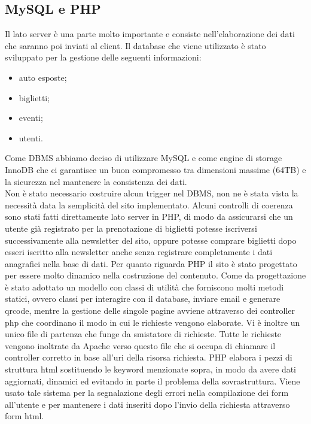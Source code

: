 \subsection{MySQL e PHP}
Il lato server è una parte molto importante e consiste nell'elaborazione dei dati che saranno poi inviati al client. Il database che viene utilizzato è stato sviluppato per la gestione delle seguenti informazioni:
\begin{itemize}
	\item auto esposte;
	\item biglietti;
	\item eventi;
	\item utenti.
\end{itemize}
Come DBMS abbiamo deciso di utilizzare MySQL e come engine di storage InnoDB che ci garantisce un buon compromesso tra dimensioni massime (64TB) e la sicurezza nel mantenere la consistenza dei dati.\\
Non è stato necessario costruire alcun trigger nel DBMS, non ne è stata vista la necessità data la semplicità del sito implementato.
Alcuni controlli di coerenza sono stati fatti direttamente lato server in PHP, di modo da assicurarsi che un utente già registrato per la prenotazione di biglietti potesse iscriversi successivamente alla newsletter del sito, oppure potesse comprare biglietti dopo esseri iscritto alla newsletter anche senza registrare completamente i dati anagrafici nella base di dati.
Per quanto riguarda PHP il sito è stato progettato per essere molto dinamico nella costruzione del contenuto.
Come da progettazione è stato adottato un modello con classi di utilità che forniscono molti metodi statici, ovvero classi per interagire con il database, inviare email e generare qrcode, mentre la gestione delle singole pagine avviene attraverso dei controller php che coordinano il modo in cui le richieste vengono elaborate.
Vi è inoltre un unico file di partenza che funge da smistatore di richieste.
Tutte le richieste vengono inoltrate da Apache verso questo file che si occupa di chiamare il controller corretto in base all'uri della risorsa richiesta.
PHP elabora i pezzi di struttura html sostituendo le keyword menzionate sopra, in modo da avere dati aggiornati, dinamici ed evitando in parte il problema della sovrastruttura.
Viene usato tale sistema per la segnalazione degli errori nella compilazione dei form all'utente e per mantenere i dati inseriti dopo l'invio della richiesta attraverso form html.

